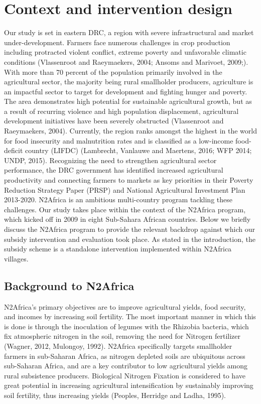 \section{Context and intervention design}
Our study is set in eastern DRC, a region with severe infrastructural and market under-development. Farmers face numerous challenges in crop production including protracted violent conflict, extreme poverty and unfavorable climatic conditions (Vlassenroot and Raeymaekers, 2004; Ansoms and Marivoet, 2009;). With more than 70 percent of the population primarily involved in the agricultural sector, the majority being rural smallholder producers, agriculture is an impactful sector to target for development and fighting hunger and poverty. The area demonstrates high potential for sustainable agricultural growth, but as a result of recurring violence and high population displacement, agricultural development initiatives have been severely obstructed (Vlassenroot and Raeymaekers, 2004).  Currently, the region ranks amongst the highest in the world for food insecurity and malnutrition rates and is classified as a low-income food-deficit country (LIFDC) (Lambrecht, Vanlauwe and Maertens, 2016; WFP 2014; UNDP, 2015). Recognizing the need to strengthen agricultural sector performance, the DRC government has identified increased agricultural productivity and connecting farmers to markets as key priorities in their Poverty Reduction Strategy Paper (PRSP) and National Agricultural Investment Plan 2013-2020. 
N2Africa is an ambitious multi-country program tackling these challenges. Our study takes place within the context of the N2Africa program, which kicked off in 2009 in eight Sub-Sahara African countries. Below we briefly discuss the N2Africa program to provide the relevant backdrop against which our subsidy intervention and evaluation took place. As stated in the introduction, the subsidy scheme is a standalone intervention implemented within N2Africa villages. 

\subsection{Background to N2Africa}
N2Africa’s primary objectives are to improve agricultural yields, food security, and incomes by increasing soil fertility. The most important manner in which this is done is through the inoculation of legumes with the Rhizobia bacteria, which fix atmospheric nitrogen in the soil, removing the need for Nitrogen fertilizer (Wagner, 2012, Mulongoy, 1992). N2Africa specifically targets smallholder farmers in sub-Saharan Africa, as nitrogen depleted soils are ubiquitous across sub-Saharan Africa, and are a key contributor to low agricultural yields among rural subsistence producers. Biological Nitrogen Fixation is considered to have great potential in increasing agricultural intensification by sustainably improving soil fertility, thus increasing yields (Peoples, Herridge and Ladha, 1995).

